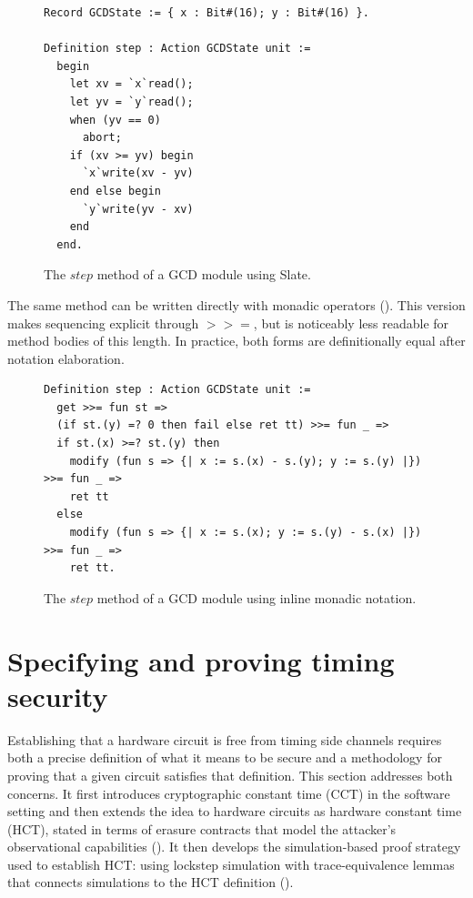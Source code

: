 \documentclass[fontset=fira-newtxsf]{mitthesis}
\theoremstyle{definition}
\theoremstyle{plain}
\begin{document}
\begin{figure}[H]
\begin{verbatim}
Record GCDState := { x : Bit#(16); y : Bit#(16) }.

Definition step : Action GCDState unit :=
  begin
    let xv = `x`read();
    let yv = `y`read();
    when (yv == 0)
      abort;
    if (xv >= yv) begin
      `x`write(xv - yv)
    end else begin
      `y`write(yv - xv)
    end
  end.
\end{verbatim}
\caption[GCD step, in Slate]{The $\mathit{step}$ method of a GCD module using Slate.}
\label{fig:slate-surface}
\end{figure}

The same method can be written directly with monadic operators ().
This version makes sequencing explicit through $\mathbin{>>=}$, but is noticeably less readable for method bodies of this length.
In practice, both forms are definitionally equal after notation elaboration.

\begin{figure}[H]
\begin{verbatim}
Definition step : Action GCDState unit :=
  get >>= fun st =>
  (if st.(y) =? 0 then fail else ret tt) >>= fun _ =>
  if st.(x) >=? st.(y) then
    modify (fun s => {| x := s.(x) - s.(y); y := s.(y) |}) >>= fun _ =>
    ret tt
  else
    modify (fun s => {| x := s.(x); y := s.(y) - s.(x) |}) >>= fun _ =>
    ret tt.
\end{verbatim}
\caption[GCD step, monadic notation]{The $\mathit{step}$ method of a GCD module using inline monadic notation.}
\label{fig:slate-bind}
\end{figure}

\section{Specifying and proving timing security} \label{sec:timing-security}

Establishing that a hardware circuit is free from timing side channels requires both a precise definition of what it means to be secure and a methodology for proving that a given circuit satisfies that definition.
This section addresses both concerns.
It first introduces cryptographic constant time (CCT) in the software setting and then extends the idea to hardware circuits as hardware constant time (HCT), stated in terms of erasure contracts that model the attacker's observational capabilities ().
It then develops the simulation-based proof strategy used to establish HCT: using lockstep simulation with trace-equivalence lemmas that connects simulations to the HCT definition ().
\end{document}
